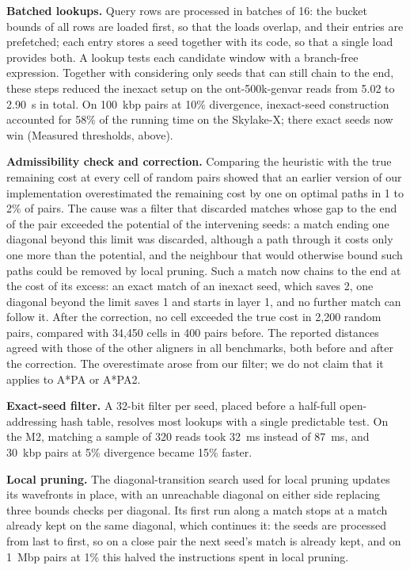 \documentclass[10pt]{article}
\begin{document}
\textbf{Batched lookups.} Query rows are processed in batches of 16: the bucket bounds of all rows are loaded first, so that the loads overlap, and their entries are prefetched; each entry stores a seed together with its code, so that a single load provides both. A lookup tests each candidate window with a branch-free expression. Together with considering only seeds that can still chain to the end, these steps reduced the inexact setup on the ont-500k-genvar reads from 5.02 to 2.90~s in total. On 100~kbp pairs at 10\% divergence, inexact-seed construction accounted for 58\% of the running time on the Skylake-X; there exact seeds now win (Measured thresholds, above).

\textbf{Admissibility check and correction.} Comparing the heuristic with the true remaining cost at every cell of random pairs showed that an earlier version of our implementation overestimated the remaining cost by one on optimal paths in 1 to 2\% of pairs. The cause was a filter that discarded matches whose gap to the end of the pair exceeded the potential of the intervening seeds: a match ending one diagonal beyond this limit was discarded, although a path through it costs only one more than the potential, and the neighbour that would otherwise bound such paths could be removed by local pruning. Such a match now chains to the end at the cost of its excess: an exact match of an inexact seed, which saves 2, one diagonal beyond the limit saves 1 and starts in layer 1, and no further match can follow it. After the correction, no cell exceeded the true cost in 2{,}200 random pairs, compared with 34{,}450 cells in 400 pairs before. The reported distances agreed with those of the other aligners in all benchmarks, both before and after the correction. The overestimate arose from our filter; we do not claim that it applies to A*PA or A*PA2.

\textbf{Exact-seed filter.} A 32-bit filter per seed, placed before a half-full open-addressing hash table, resolves most lookups with a single predictable test. On the M2, matching a sample of 320 reads took 32~ms instead of 87~ms, and 30~kbp pairs at 5\% divergence became 15\% faster.

\textbf{Local pruning.} The diagonal-transition search used for local pruning updates its wavefronts in place, with an unreachable diagonal on either side replacing three bounds checks per diagonal. Its first run along a match stops at a match already kept on the same diagonal, which continues it: the seeds are processed from last to first, so on a close pair the next seed's match is already kept, and on 1~Mbp pairs at 1\% this halved the instructions spent in local pruning.
\end{document}
